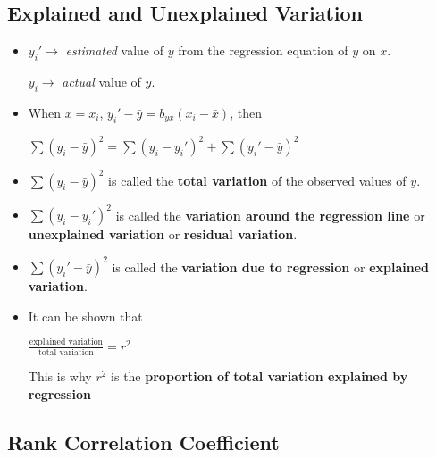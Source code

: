 \subsection*{Explained and Unexplained Variation}

\begin{itemize}
    \item $y_i' \rightarrow$ \textit{estimated} value of $y$ from the regression equation of $y$ on $x$.

        $y_i \rightarrow$ \textit{actual} value of $y$.

    \item When $x = x_i$, $y_i' - \bar{y} = b_{yx} (x_i - \bar{x})$, then

        $\sum (y_i - \bar{y})^2 = \sum (y_i - y_i')^2 + \sum (y_i' - \bar{y})^2$

    \item $\sum (y_i - \bar{y})^2$ is called the \textbf{total variation} of the observed values of  $y$.

    \item $\sum (y_i - y_i')^2$ is called the \textbf{variation around the regression line} or \textbf{unexplained variation} or \textbf{residual variation}.

    \item $\sum (y_i' - \bar{y})^2$ is called the \textbf{variation due to regression} or \textbf{explained variation}.

    \item It can be shown that

        $\frac{\text{explained variation}}{\text{total variation}} = r^2$

        This is why $r^2$ is the \textbf{proportion of total variation explained by regression}

\end{itemize}

\subsection*{Rank Correlation Coefficient}

